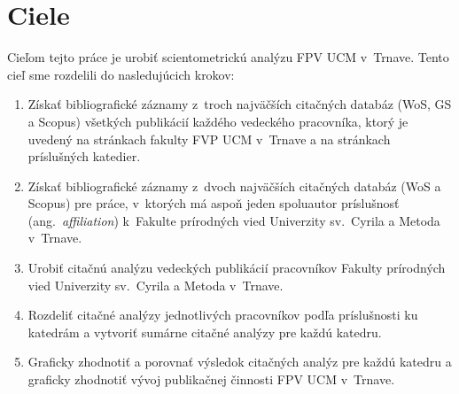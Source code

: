 \chapter{Ciele}
\label{chap:objectives}

Cieľom tejto práce je urobiť scientometrickú analýzu FPV UCM v~Trnave.  Tento
cieľ sme rozdelili do nasledujúcich krokov:

\begin{enumerate}
\item Získať bibliografické záznamy z~troch najväčších citačných databáz (WoS,
  GS a Scopus) všetkých publikácií každého vedeckého pracovníka, ktorý je
  uvedený na stránkach fakulty FVP UCM v~Trnave a na stránkach príslušných
  katedier.
\item Získať bibliografické záznamy z~dvoch najväčších citačných databáz (WoS a
  Scopus) pre práce, v~ktorých má aspoň jeden spoluautor príslušnosť
  (ang.~\emph{affiliation}) k~Fakulte prírodných vied Univerzity sv.~Cyrila a
  Metoda v~Trnave.
\item Urobiť citačnú analýzu vedeckých publikácií pracovníkov Fakulty prírodných
  vied Univerzity sv.~Cyrila a Metoda v~Trnave.
\item Rozdeliť citačné analýzy jednotlivých pracovníkov podľa príslušnosti ku
  katedrám a vytvoriť sumárne citačné analýzy pre každú katedru.
\item Graficky zhodnotiť a porovnať výsledok citačných analýz pre každú katedru
  a graficky zhodnotiť vývoj publikačnej činnosti FPV UCM v~Trnave.
\end{enumerate}


